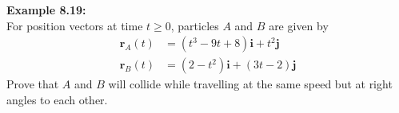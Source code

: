 \documentclass[10pt,a4paper]{article}
\newcommand{\dotline}{\noindent\makebox[\linewidth]{\dotfill}\\[1em]}
\begin{document}
\textbf{\textcolor{OliveGreen}{Example 8.19}:}\\
For position vectors at time $t\geq 0$, particles $A$ and $B$ are given by 
\begin{align*}
	\boldsymbol{r}_A (t)& = (t^3 - 9t + 8)\boldsymbol{i}+t^2\boldsymbol{j}\\
	\boldsymbol{r}_B (t)& = (2-t^2)\boldsymbol{i} + (3t-2)\boldsymbol{j}
\end{align*}
Prove that $A$ and $B$ will collide while travelling at the same speed but at right angles to each other.

\dotline
\dotline
\dotline
\dotline
\dotline
\dotline
\dotline
\dotline
\dotline
\dotline
\dotline
\dotline
\dotline
\dotline
\dotline
\dotline
\dotline
\dotline
\dotline
\dotline
\dotline
\dotline
\dotline
\dotline
\dotline
\dotline
\end{document}
